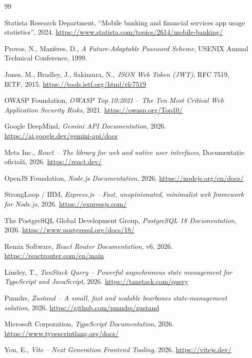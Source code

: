 \documentclass[12pt,a4paper,oneside]{report}
\begin{document}
\begin{thebibliography}{99}
{}

Statista Research Department, ``Mobile banking and financial services app usage statistics'', 2024. \url{https://www.statista.com/topics/2614/mobile-banking/}

Provos, N., Mazières, D., \emph{A Future-Adaptable Password Scheme}, USENIX Annual Technical Conference, 1999.

Jones, M., Bradley, J., Sakimura, N., \emph{JSON Web Token (JWT)}, RFC 7519, IETF, 2015. \url{https://tools.ietf.org/html/rfc7519}

OWASP Foundation, \emph{OWASP Top 10:2021 -- The Ten Most Critical Web Application Security Risks}, 2021. \url{https://owasp.org/Top10/}

Google DeepMind, \emph{Gemini API Documentation}, 2026. \url{https://ai.google.dev/gemini-api/docs}

Meta Inc., \emph{React -- The library for web and native user interfaces}, Documentație oficială, 2026. \url{https://react.dev/}

OpenJS Foundation, \emph{Node.js Documentation}, 2026. \url{https://nodejs.org/en/docs/}

StrongLoop / IBM, \emph{Express.js -- Fast, unopinionated, minimalist web framework for Node.js}, 2026. \url{https://expressjs.com/}

The PostgreSQL Global Development Group, \emph{PostgreSQL 18 Documentation}, 2026. \url{https://www.postgresql.org/docs/18/}

Remix Software, \emph{React Router Documentation}, v6, 2026. \url{https://reactrouter.com/en/main}

Linsley, T., \emph{TanStack Query -- Powerful asynchronous state management for TypeScript and JavaScript}, 2026. \url{https://tanstack.com/query}

Pmndrs, \emph{Zustand -- A small, fast and scalable bearbones state-management solution}, 2026. \url{https://github.com/pmndrs/zustand}

Microsoft Corporation, \emph{TypeScript Documentation}, 2026. \url{https://www.typescriptlang.org/docs/}

You, E., \emph{Vite -- Next Generation Frontend Tooling}, 2026. \url{https://vitejs.dev/}


\end{thebibliography}
\end{document}
